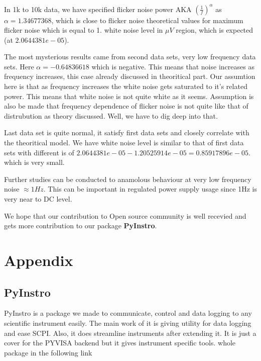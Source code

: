 \documentclass[draft,12pt]{article}
\begin{document}
In 1k to 10k data, we have specified flicker noise power AKA $(\frac{1}{f})^{\alpha}$ as $\alpha = 1.34677368$, which is close to flicker noise theoretical values for maximum flicker noise which is equal to 1. white noise level in $\mu V$ region, which is expected (at $2.0644381e-05$). 


The most mysterious results came from second data sets, very low frequency data sets. Here  $\alpha= -0.64836618$ which is negative. This means that noise increases as frequency increases, this case already discussed in theoritical part. Our assumtion here is that as frequency increases the white noise gets saturated to it’s related power. This means that white noise is not quite white as it seems. Assumption is also be made that frequency dependence of flicker noise is not quite like that of distrubution as theory discussed. Well, we have to dig deep into that.

Last data set is quite normal, it satisfy first data sets and closely correlate with the theoritical model. We have white noise level is similar to that of first data sets with different is of $2.0644381e-05-1.20525914e-05 = 0.85917896e-05$. which is very small. 

Further studies can be conducted to anamolous behaviour at very low frequency noise $\approx 1Hz$. This can be important in regulated power supply usage since 1Hz is very near to DC level. 

We hope that our contribution to Open source community is well recevied and gets more contribution to our package \textbf{PyInstro}.

\clearpage






\clearpage

\section*{Appendix}

\subsection*{PyInstro}

PyInstro is a package we made to communicate, control and data logging to any scientific instrument easily. The main work of it is giving utility for data logging and ease SCPI. Also, it does streamline instruments after extending it. It is just a cover for the PYVISA backend but it gives instrument specific tools. whole package in the following link
\end{document}
